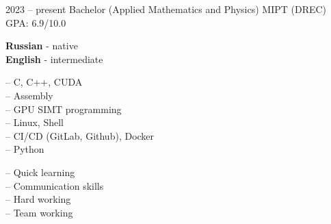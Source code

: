 \documentclass[9pt]{developercv} %
\begin{document}


\begin{entrylist}
        \entry
                {2023 -- present}
                {Bachelor (Applied Mathematics and Physics)}
                {MIPT (DREC)}
                {GPA: 6.9/10.0 }

\end{entrylist}


\begin{minipage}[t]{0.3\textwidth}
        \vspace{-\baselineskip} %


        \textbf{Russian} - native\\
        \textbf{English} - intermediate
\end{minipage}
\hfill
\begin{minipage}[t]{0.3\textwidth}
        \vspace{-\baselineskip} %


        -- C, C++, CUDA\\
        -- Assembly\\
        -- GPU SIMT programming\\
        -- Linux, Shell\\
        -- CI/CD (GitLab, Github), Docker\\
        -- Python

\end{minipage}
\hfill
\begin{minipage}[t]{0.3\textwidth}
        \vspace{-\baselineskip} %


        -- Quick learning\\
        -- Communication skills\\
        -- Hard working\\
        -- Team working
\end{minipage}

\end{document}
